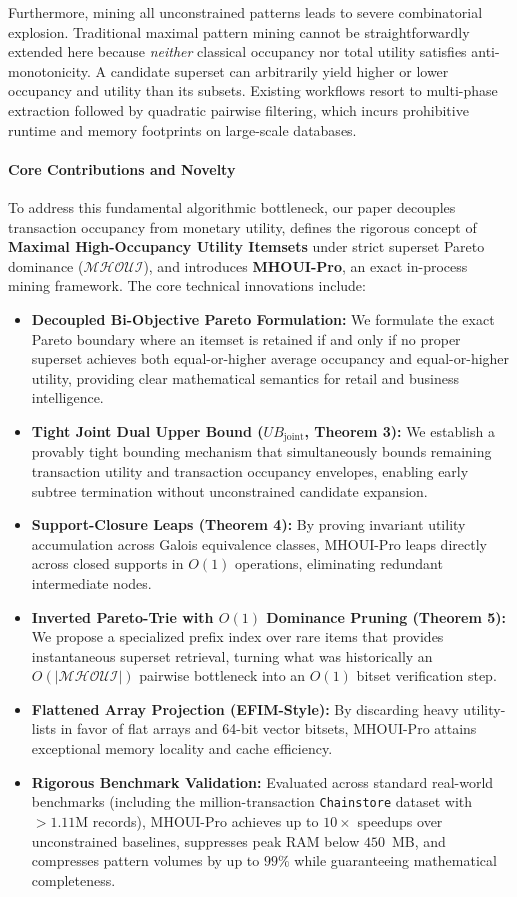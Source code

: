 \documentclass[11pt,a4paper]{article}
\begin{document}
Furthermore, mining all unconstrained patterns leads to severe combinatorial explosion. Traditional maximal pattern mining cannot be straightforwardly extended here because \emph{neither} classical occupancy nor total utility satisfies anti-monotonicity. A candidate superset can arbitrarily yield higher or lower occupancy and utility than its subsets. Existing workflows resort to multi-phase extraction followed by quadratic pairwise filtering, which incurs prohibitive runtime and memory footprints on large-scale databases.

\paragraph{Core Contributions and Novelty}
To address this fundamental algorithmic bottleneck, our paper decouples transaction occupancy from monetary utility, defines the rigorous concept of \textbf{Maximal High-Occupancy Utility Itemsets} under strict superset Pareto dominance ($\mathcal{MHOUI}$), and introduces \textbf{MHOUI-Pro}, an exact in-process mining framework. The core technical innovations include:
\begin{itemize}
    \item \textbf{Decoupled Bi-Objective Pareto Formulation:} We formulate the exact Pareto boundary where an itemset is retained if and only if no proper superset achieves both equal-or-higher average occupancy and equal-or-higher utility, providing clear mathematical semantics for retail and business intelligence.
    \item \textbf{Tight Joint Dual Upper Bound ($UB_{\mathrm{joint}}$, Theorem 3):} We establish a provably tight bounding mechanism that simultaneously bounds remaining transaction utility and transaction occupancy envelopes, enabling early subtree termination without unconstrained candidate expansion.
    \item \textbf{Support-Closure Leaps (Theorem 4):} By proving invariant utility accumulation across Galois equivalence classes, MHOUI-Pro leaps directly across closed supports in $O(1)$ operations, eliminating redundant intermediate nodes.
    \item \textbf{Inverted Pareto-Trie with $O(1)$ Dominance Pruning (Theorem 5):} We propose a specialized prefix index over rare items that provides instantaneous superset retrieval, turning what was historically an $O(|\mathcal{MHOUI}|)$ pairwise bottleneck into an $O(1)$ bitset verification step.
    \item \textbf{Flattened Array Projection (EFIM-Style):} By discarding heavy utility-lists in favor of flat arrays and 64-bit vector bitsets, MHOUI-Pro attains exceptional memory locality and cache efficiency.
    \item \textbf{Rigorous Benchmark Validation:} Evaluated across standard real-world benchmarks (including the million-transaction \texttt{Chainstore} dataset with $>1.11$M records), MHOUI-Pro achieves up to $10\times$ speedups over unconstrained baselines, suppresses peak RAM below $450$~MB, and compresses pattern volumes by up to $99\%$ while guaranteeing mathematical completeness.
\end{itemize}
\end{document}
